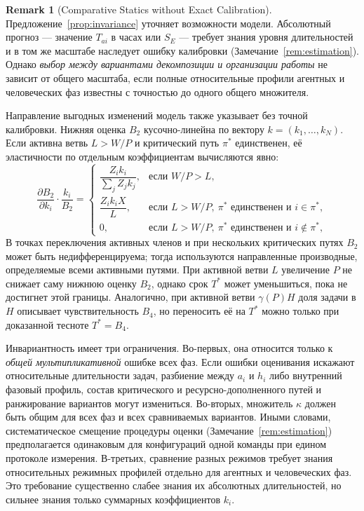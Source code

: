 \documentclass[12pt,a4paper]{article}
\theoremstyle{definition}
\newtheorem{remark}{Remark}
\begin{document}
\begin{remark}[Comparative Statics without Exact Calibration]\label{rem:comparative}
Предложение~\ref{prop:invariance} уточняет возможности модели. Абсолютный прогноз --- значение $T_{ai}$ в часах или $S_E$ --- требует знания уровня длительностей и в том же масштабе наследует ошибку калибровки (Замечание~\ref{rem:estimation}). Однако \emph{выбор между вариантами декомпозиции и организации работы} не зависит от общего масштаба, если полные относительные профили агентных и человеческих фаз известны с точностью до одного общего множителя.

Направление выгодных изменений модель также указывает без точной калибровки. Нижняя оценка $B_2$ кусочно-линейна по вектору $k = (k_1, \dots, k_N)$. Если активна ветвь $L>W/P$ и критический путь $\pi^*$ единственен, её эластичности по отдельным коэффициентам вычисляются явно:
\[
  \frac{\partial B_2}{\partial k_i} \cdot \frac{k_i}{B_2} =
  \begin{cases}
    \dfrac{Z_i k_i}{\sum_{j} Z_j k_j}, & \text{если } W/P > L, \\[2.5ex]
    \dfrac{Z_i k_i X}{L}, & \text{если } L > W/P,\ \pi^*\text{ единственен и }i \in \pi^{*}, \\[2.5ex]
    0, & \text{если } L > W/P,\ \pi^*\text{ единственен и }i \notin \pi^{*},
  \end{cases}
\]
В точках переключения активных членов и при нескольких критических путях $B_2$ может быть недифференцируема; тогда используются направленные производные, определяемые всеми активными путями. При активной ветви $L$ увеличение $P$ не снижает саму нижнюю оценку $B_2$, однако срок $T^*$ может уменьшиться, пока не достигнет этой границы. Аналогично, при активной ветви $\gamma(P)H$ доля задачи в $H$ описывает чувствительность $B_4$, но переносить её на $T^*$ можно только при доказанной тесноте $T^*=B_4$.

Инвариантность имеет три ограничения. Во-первых, она относится только к
\emph{общей мультипликативной} ошибке всех фаз. Если ошибки оценивания искажают
относительные длительности задач, разбиение между $a_i$ и $h_i$ либо внутренний
фазовый профиль, состав критического и ресурсно-дополненного путей и ранжирование
вариантов могут измениться. Во-вторых, множитель $\kappa$ должен быть общим для
всех фаз и всех сравниваемых вариантов. Иными словами, систематическое смещение
процедуры оценки (Замечание~\ref{rem:estimation}) предполагается одинаковым для
конфигураций одной команды при едином протоколе измерения. В-третьих, сравнение
разных режимов требует знания относительных режимных профилей отдельно для
агентных и человеческих фаз. Это требование существенно слабее знания их
абсолютных длительностей, но сильнее знания только суммарных коэффициентов $k_i$.
\end{remark}
\end{document}
